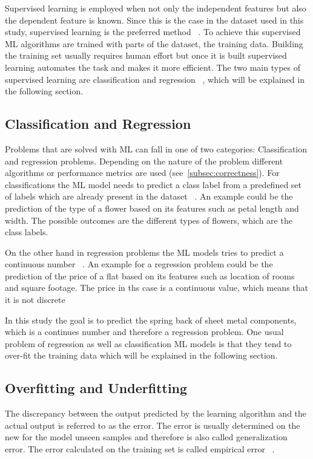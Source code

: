 Supervised learning is employed when not only the independent features but also the dependent feature is known.
Since this is the case in the dataset used in this study, supervised learning is the preferred
method
~\cite[p. 2]{muller2016introduction}.
To achieve this supervised \ac{ML} algorithms are trained with parts of the dataset, the training data.
Building the training set usually requires human effort but once it is built supervised learning automates the task
and makes it more efficient.
The two main types of supervised learning are classification and regression
~\cite[p. 25]{muller2016introduction}, which will be explained in the following section.

\subsection{Classification and Regression}\label{subsec:regression}
Problems that are solved with \ac{ML} can fall in one of two categories:
Classification and regression problems.
Depending on the nature of the problem different algorithms or performance metrics are used
(see~\cref{subsec:correctness}).
For classifications the ML model needs to predict a class label from a predefined set of labels which are already
present in the dataset
~\cite[pp. 25--26]{muller2016introduction}.
An example could be the prediction of the type of a flower based on its features such as
petal length and width.
The possible outcomes are the different types of flowers, which are the class labels.

On the other hand in regression problems the ML models tries to predict a continuous number
~\cite[pp. 25--26]{muller2016introduction}.
An example for a regression problem could be the prediction of the price of a flat based on its features such as
location of rooms and square footage.
The price in ths case is a continuous value, which means that it is not discrete

In this study the goal is to predict the spring back of sheet metal components, which is a continues number and
therefore a regression problem.
One usual problem of regression as well as classification ML models is that they tend to over-fit the training data
which will be explained in the following section.

\subsection{Overfitting and Underfitting}\label{subsec:overfitting-and-underfitting}
The discrepancy between the output predicted by the learning algorithm and the actual output is referred to as the
error.
The error is usually determined on the new for the model unseen samples and therefore is also
called generalization error.
The error calculated on the training set is called empirical error
~\cite[p. 26]{zhou2021machine}.

